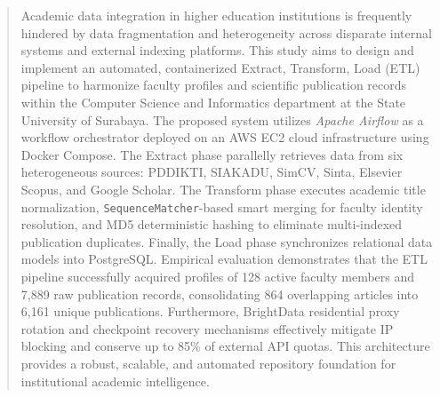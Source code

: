 \documentclass{rapidsart}
\theoremstyle{plain}
\theoremstyle{remark}
\theoremstyle{definition}
\begin{document}
\begin{frontmatter}
    \begin{kunciwords}
    \end{kunciwords}

    \begin{abstract}
        Academic data integration in higher education institutions is frequently hindered by data fragmentation and heterogeneity across disparate internal systems and external indexing platforms. This study aims to design and implement an automated, containerized Extract, Transform, Load (ETL) pipeline to harmonize faculty profiles and scientific publication records within the Computer Science and Informatics department at the State University of Surabaya. The proposed system utilizes \textit{Apache Airflow} as a workflow orchestrator deployed on an AWS EC2 cloud infrastructure using Docker Compose. The Extract phase parallelly retrieves data from six heterogeneous sources: PDDIKTI, SIAKADU, SimCV, Sinta, Elsevier Scopus, and Google Scholar. The Transform phase executes academic title normalization, \texttt{SequenceMatcher}-based smart merging for faculty identity resolution, and MD5 deterministic hashing to eliminate multi-indexed publication duplicates. Finally, the Load phase synchronizes relational data models into PostgreSQL. Empirical evaluation demonstrates that the ETL pipeline successfully acquired profiles of 128 active faculty members and 7,889 raw publication records, consolidating 864 overlapping articles into 6,161 unique publications. Furthermore, BrightData residential proxy rotation and checkpoint recovery mechanisms effectively mitigate IP blocking and conserve up to 85\% of external API quotas. This architecture provides a robust, scalable, and automated repository foundation for institutional academic intelligence.
    \end{abstract}

    \begin{keywords}
    \end{keywords}

    \received{\today}
    \revised{\today}
    \accepted{\today}

\end{frontmatter}
\end{document}
